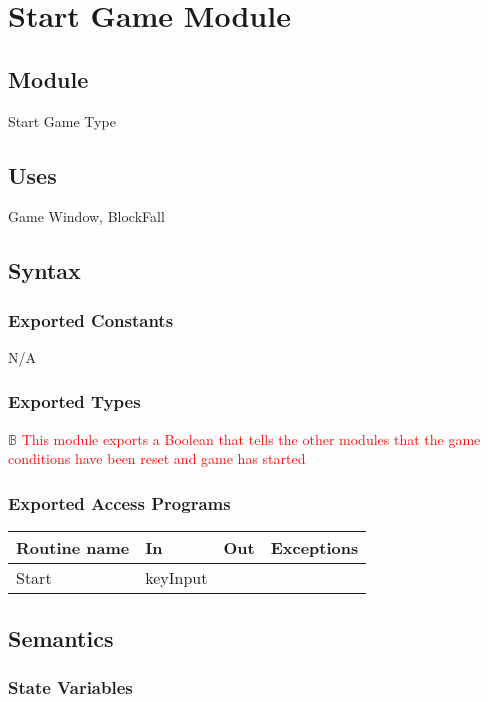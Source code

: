 \documentclass[12pt]{article}
\begin{document}
\newpage

\section* {Start Game Module}

\subsection*{Module}

Start Game Type

\subsection* {Uses}

Game Window, BlockFall

\subsection* {Syntax}

\subsubsection* {Exported Constants}
N/A
\subsubsection* {Exported Types}

$\mathbb{B}$ \textcolor{red}{This module exports a Boolean that tells the other modules that the game conditions have been reset and game has started}


\subsubsection* {Exported Access Programs}

\begin{tabular}{| l | l | l | l |}
\hline
\textbf{Routine name} & \textbf{In} & \textbf{Out} & \textbf{Exceptions}\\
\hline
Start & keyInput &  &  \\
\hline
\end{tabular}

\subsection* {Semantics}

\subsubsection* {State Variables}
\end{document}
